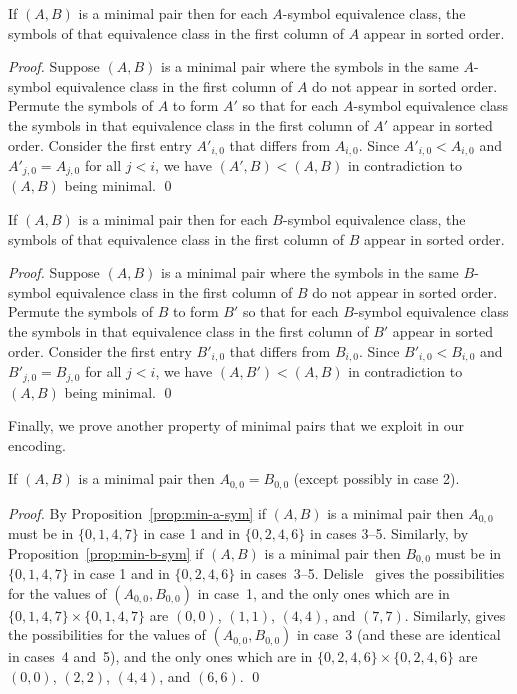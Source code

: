 \documentclass[runningheads]{llncs}
\begin{document}
\begin{proposition}\label{prop:min-a-sym}
If $(A,B)$ is a minimal pair then for each $A$-symbol equivalence class, the
symbols of that equivalence class in the first column of\/ $A$ appear in sorted order.
\end{proposition}

\begin{proof}
Suppose $(A,B)$ is a minimal pair where the symbols in the same $A$-symbol equivalence
class in the first column of $A$ do not appear in sorted order.
Permute the symbols of $A$ to form $A'$ so that for each $A$-symbol equivalence class
the symbols in that equivalence class in the first column of $A'$ appear in sorted order.
Consider the first entry $A'_{i,0}$ that differs from $A_{i,0}$.  Since $A'_{i,0}<A_{i,0}$
and $A'_{j,0}=A_{j,0}$ for all $j<i$, we have $(A',B)<(A,B)$ in contradiction to $(A,B)$
being minimal. \qed
\end{proof}

\begin{proposition}\label{prop:min-b-sym}
If $(A,B)$ is a minimal pair then for each $B$-symbol equivalence class, the
symbols of that equivalence class in the first column of\/ $B$ appear in sorted order.
\end{proposition}

\begin{proof}
Suppose $(A,B)$ is a minimal pair where the symbols in the same $B$-symbol equivalence
class in the first column of $B$ do not appear in sorted order.
Permute the symbols of $B$ to form $B'$ so that for each $B$-symbol equivalence class
the symbols in that equivalence class in the first column of $B'$ appear in sorted order.
Consider the first entry $B'_{i,0}$ that differs from $B_{i,0}$.  Since $B'_{i,0}<B_{i,0}$
and $B'_{j,0}=B_{j,0}$ for all $j<i$, we have $(A,B')<(A,B)$ in contradiction to $(A,B)$
being minimal. \qed
\end{proof}

Finally, we prove another property of minimal pairs that we exploit in our encoding.

\begin{proposition}\label{prop:a00b00}
If $(A,B)$ is a minimal pair then $A_{0,0}=B_{0,0}$ (except possibly in case 2).
\end{proposition}

\begin{proof}
By Proposition~\ref{prop:min-a-sym} if $(A,B)$ is a minimal pair then $A_{0,0}$
must be in $\{0,1,4,7\}$ in case 1 and in $\{0,2,4,6\}$ in cases 3--5.  Similarly, by
Proposition~\ref{prop:min-b-sym} if $(A,B)$ is a minimal pair then $B_{0,0}$ must
be in $\{0,1,4,7\}$ in case 1 and in $\{0,2,4,6\}$ in cases~3--5.
Delisle~\cite[pg.~18]{delisle2010search} gives the possibilities
for the values of $(A_{0,0},B_{0,0})$ in case~1, and the only ones
which are in $\{0,1,4,7\}\times\{0,1,4,7\}$ are $(0,0)$, $(1,1)$, $(4,4)$, and $(7,7)$.
Similarly, \cite[pg.~20]{delisle2010search} gives the possibilities for the values of $(A_{0,0},B_{0,0})$ in case~3
(and these are identical in cases~4 and~5),
and the only ones which are in $\{0,2,4,6\}\times\{0,2,4,6\}$ are
$(0,0)$, $(2,2)$, $(4,4)$, and $(6,6)$. \qed
\end{proof}
\end{document}
